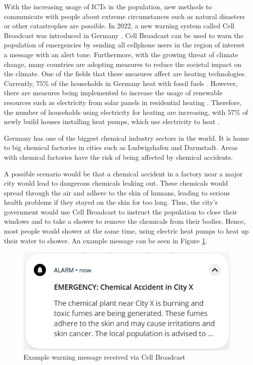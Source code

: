 With the increasing usage of ICTs in the population,
new methods to communicate with people about extreme circumstances
such as natural disasters or other catastrophes are possible. In 2022,
a new warning system called Cell Broadcast was introduced in Germany
\cite{techrichtlinie}. Cell Broadcast can be used to warn the population
of emergencies by sending all cellphone users in the 
region of interest a message with an alert tone.
Furthermore, with the growing threat of climate change, many countries
are adopting measures to reduce the societal impact on the
climate. One of the fields that these measures affect 
are heating technologies. Currently, $75\%$ of the households 
in Germany heat with fossil fuels \cite{bdewhouhseholds}. 
However, there are measures being 
implemented to increase the usage of renewable resources such 
as electricity from solar panels in residential heating
\cite{heizungsgesetz}. Therefore, the number of households 
using electricity for heating are increasing, with 
$57\%$ of newly build houses installing 
heat pumps, which use electricity to heat
\cite{heatingpumps}.

Germany has one of the biggest chemical industry sectors in the world.
It is home to big chemical factories in cities such as Ludwigshafen and
Darmstadt. Areas with chemical factories have the risk of being
affected by chemical accidents.

A possible scenario would be that a chemical accident in a 
factory near a major city would lead to dangerous chemicals 
leaking out. These chemicals would spread through the air 
and adhere to the skin of humans, leading to serious 
health problems if they stayed on the skin for too long.
Thus, the city's government would use Cell Broadcast to
instruct the population to close their windows and 
to take a shower to remove the chemicals from their bodies.
Hence, most people would shower at the same time,
using electric heat pumps to heat up their water to shower.
An example message can be seen in Figure \ref{warningmessage}.

\begin{figure}[!ht]
    \center
    \includegraphics[scale=.7]{figs/emergencychemical.png}
    \caption{Example warning message received via Cell Broadcast}
    \label{warningmessage}
\end{figure}

